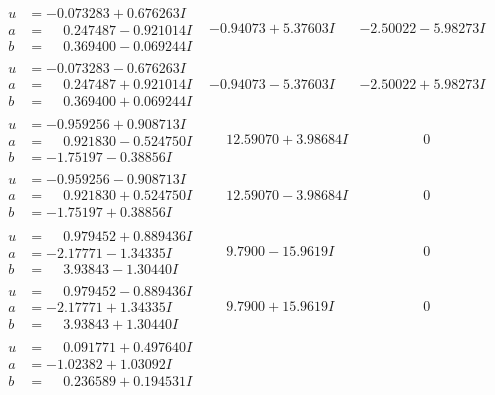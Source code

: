 \documentclass[1p]{elsarticle_modified}
\theoremstyle{definition}
\begin{document}
$$\begin{array}{c|c|c}
\begin{aligned}
u &= -0.073283 + 0.676263 I \\
a &= \phantom{-}0.247487 - 0.921014 I \\
b &= \phantom{-}0.369400 - 0.069244 I\end{aligned}
 & -0.94073 + 5.37603 I & -2.50022 - 5.98273 I \\ \hline\begin{aligned}
u &= -0.073283 - 0.676263 I \\
a &= \phantom{-}0.247487 + 0.921014 I \\
b &= \phantom{-}0.369400 + 0.069244 I\end{aligned}
 & -0.94073 - 5.37603 I & -2.50022 + 5.98273 I \\ \hline\begin{aligned}
u &= -0.959256 + 0.908713 I \\
a &= \phantom{-}0.921830 - 0.524750 I \\
b &= -1.75197 - 0.38856 I\end{aligned}
 & \phantom{-}12.59070 + 3.98684 I & \phantom{-0.000000 } 0 \\ \hline\begin{aligned}
u &= -0.959256 - 0.908713 I \\
a &= \phantom{-}0.921830 + 0.524750 I \\
b &= -1.75197 + 0.38856 I\end{aligned}
 & \phantom{-}12.59070 - 3.98684 I & \phantom{-0.000000 } 0 \\ \hline\begin{aligned}
u &= \phantom{-}0.979452 + 0.889436 I \\
a &= -2.17771 - 1.34335 I \\
b &= \phantom{-}3.93843 - 1.30440 I\end{aligned}
 & \phantom{-}9.7900 - 15.9619 I & \phantom{-0.000000 } 0 \\ \hline\begin{aligned}
u &= \phantom{-}0.979452 - 0.889436 I \\
a &= -2.17771 + 1.34335 I \\
b &= \phantom{-}3.93843 + 1.30440 I\end{aligned}
 & \phantom{-}9.7900 + 15.9619 I & \phantom{-0.000000 } 0 \\ \hline\begin{aligned}
u &= \phantom{-}0.091771 + 0.497640 I \\
a &= -1.02382 + 1.03092 I \\
b &= \phantom{-}0.236589 + 0.194531 I\end{aligned}

\end{array}$$
\end{document}

